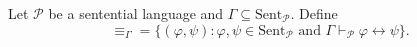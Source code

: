 Let $\mathcal{P}$ be a sentential language and $\Gamma \subseteq \text{Sent}_{\mathcal{P}}$. Define
$$\equiv_{\Gamma} = \{(\varphi, \psi) : \varphi, \psi \in \text{Sent}_{\mathcal{P}} \text{ and } \Gamma \vdash_{\mathcal{P}} \varphi \leftrightarrow \psi\}.$$
